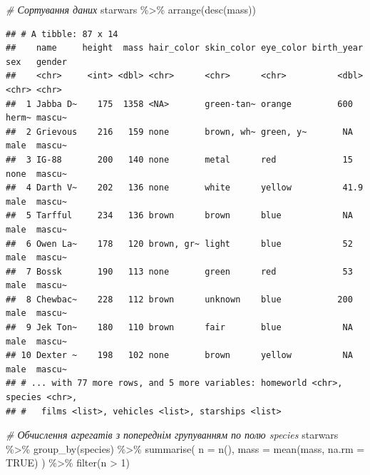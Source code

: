 \documentclass[
]{book}
\newenvironment{Shaded}{\begin{snugshade}}{\end{snugshade}}
\newcommand{\AttributeTok}[1]{\textcolor[rgb]{0.77,0.63,0.00}{#1}}
\newcommand{\CommentTok}[1]{\textcolor[rgb]{0.56,0.35,0.01}{\textit{#1}}}
\newcommand{\ConstantTok}[1]{\textcolor[rgb]{0.00,0.00,0.00}{#1}}
\newcommand{\DecValTok}[1]{\textcolor[rgb]{0.00,0.00,0.81}{#1}}
\newcommand{\FunctionTok}[1]{\textcolor[rgb]{0.00,0.00,0.00}{#1}}
\newcommand{\NormalTok}[1]{#1}
\newcommand{\SpecialCharTok}[1]{\textcolor[rgb]{0.00,0.00,0.00}{#1}}
\begin{document}
\begin{Shaded}
\begin{Highlighting}[]
\CommentTok{\# Сортування даних}
\NormalTok{starwars }\SpecialCharTok{\%\textgreater{}\%} 
  \FunctionTok{arrange}\NormalTok{(}\FunctionTok{desc}\NormalTok{(mass))}
\end{Highlighting}
\end{Shaded}

\begin{verbatim}
## # A tibble: 87 x 14
##    name     height  mass hair_color skin_color eye_color birth_year sex   gender
##    <chr>     <int> <dbl> <chr>      <chr>      <chr>          <dbl> <chr> <chr> 
##  1 Jabba D~    175  1358 <NA>       green-tan~ orange         600   herm~ mascu~
##  2 Grievous    216   159 none       brown, wh~ green, y~       NA   male  mascu~
##  3 IG-88       200   140 none       metal      red             15   none  mascu~
##  4 Darth V~    202   136 none       white      yellow          41.9 male  mascu~
##  5 Tarfful     234   136 brown      brown      blue            NA   male  mascu~
##  6 Owen La~    178   120 brown, gr~ light      blue            52   male  mascu~
##  7 Bossk       190   113 none       green      red             53   male  mascu~
##  8 Chewbac~    228   112 brown      unknown    blue           200   male  mascu~
##  9 Jek Ton~    180   110 brown      fair       blue            NA   male  mascu~
## 10 Dexter ~    198   102 none       brown      yellow          NA   male  mascu~
## # ... with 77 more rows, and 5 more variables: homeworld <chr>, species <chr>,
## #   films <list>, vehicles <list>, starships <list>
\end{verbatim}

\begin{Shaded}
\begin{Highlighting}[]
\CommentTok{\# Обчислення агрегатів з попереднім групуванням по полю species}
\NormalTok{starwars }\SpecialCharTok{\%\textgreater{}\%}
  \FunctionTok{group\_by}\NormalTok{(species) }\SpecialCharTok{\%\textgreater{}\%}
  \FunctionTok{summarise}\NormalTok{(}
    \AttributeTok{n =} \FunctionTok{n}\NormalTok{(),}
    \AttributeTok{mass =} \FunctionTok{mean}\NormalTok{(mass, }\AttributeTok{na.rm =} \ConstantTok{TRUE}\NormalTok{)}
\NormalTok{  ) }\SpecialCharTok{\%\textgreater{}\%}
  \FunctionTok{filter}\NormalTok{(n }\SpecialCharTok{\textgreater{}} \DecValTok{1}\NormalTok{)}
\end{Highlighting}
\end{Shaded}
\end{document}
